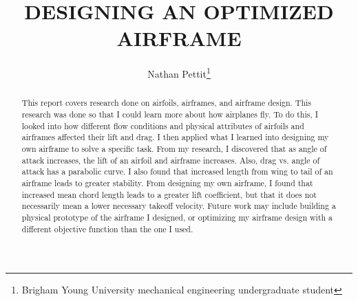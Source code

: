 \documentclass[journal]{new-aiaa}
\title{DESIGNING AN OPTIMIZED AIRFRAME}
\author{Nathan Pettit\footnote{Brigham Young University mechanical engineering undergraduate student}}
\affil{Brigham Young University, Provo, Utah, 84604}
\begin{document}
	
	\maketitle
	
	\begin{abstract}
		
		
		
		
		
		
		
		
		
		
		
		
		
		
		
		
		
		
		
		
		
		This report covers research done on airfoils, airframes, and airframe design. This research was done so that I could learn more about how airplanes fly. To do this, I looked into how different flow conditions and physical attributes of airfoils and airframes affected their lift and drag. I then applied what I learned into designing my own airframe to solve a specific task. From my research, I discovered that as angle of attack increases, the lift of an airfoil and airframe increases. Also, drag vs. angle of attack has a parabolic curve. I also found that increased length from wing to tail of an airframe leads to greater stability. From designing my own airframe, I found that increased mean chord length leads to a greater lift coefficient, but that it does not necessarily mean a lower necessary takeoff velocity. Future work may include building a physical prototype of the airframe I designed, or optimizing my airframe design with a different objective function than the one I used.\\
		

\end{abstract}
\end{document}
